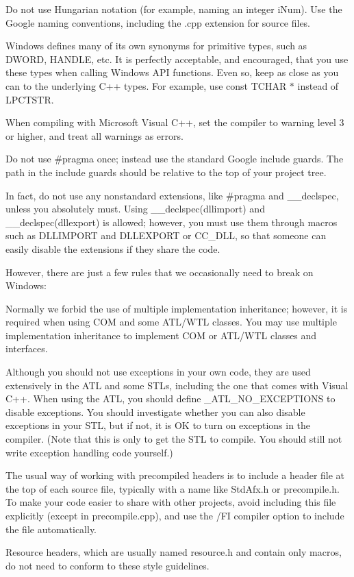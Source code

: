 \begin{DoxyItemize}
\item Do not use Hungarian notation (for example, naming an integer i\+Num). Use the Google naming conventions, including the .cpp extension for source files.
\item Windows defines many of its own synonyms for primitive types, such as D\+W\+O\+RD, H\+A\+N\+D\+LE, etc. It is perfectly acceptable, and encouraged, that you use these types when calling Windows A\+PI functions. Even so, keep as close as you can to the underlying C++ types. For example, use const T\+C\+H\+AR $\ast$ instead of L\+P\+C\+T\+S\+TR.
\item When compiling with Microsoft Visual C++, set the compiler to warning level 3 or higher, and treat all warnings as errors.
\item Do not use \#pragma once; instead use the standard Google include guards. The path in the include guards should be relative to the top of your project tree.
\item In fact, do not use any nonstandard extensions, like \#pragma and \+\_\+\+\_\+declspec, unless you absolutely must. Using {\ttfamily \+\_\+\+\_\+declspec(dllimport)} and {\ttfamily \+\_\+\+\_\+declspec(dllexport)} is allowed; however, you must use them through macros such as {\ttfamily D\+L\+L\+I\+M\+P\+O\+RT} and {\ttfamily D\+L\+L\+E\+X\+P\+O\+RT} or {\ttfamily C\+C\+\_\+\+D\+LL}, so that someone can easily disable the extensions if they share the code.
\end{DoxyItemize}

However, there are just a few rules that we occasionally need to break on Windows\+:


\begin{DoxyItemize}
\item Normally we forbid the use of multiple implementation inheritance; however, it is required when using C\+OM and some A\+T\+L/\+W\+TL classes. You may use multiple implementation inheritance to implement C\+OM or A\+T\+L/\+W\+TL classes and interfaces.
\item Although you should not use exceptions in your own code, they are used extensively in the A\+TL and some S\+T\+Ls, including the one that comes with Visual C++. When using the A\+TL, you should define \+\_\+\+A\+T\+L\+\_\+\+N\+O\+\_\+\+E\+X\+C\+E\+P\+T\+I\+O\+NS to disable exceptions. You should investigate whether you can also disable exceptions in your S\+TL, but if not, it is OK to turn on exceptions in the compiler. (Note that this is only to get the S\+TL to compile. You should still not write exception handling code yourself.)
\item The usual way of working with precompiled headers is to include a header file at the top of each source file, typically with a name like Std\+Afx.\+h or precompile.\+h. To make your code easier to share with other projects, avoid including this file explicitly (except in precompile.\+cpp), and use the /\+FI compiler option to include the file automatically.
\item Resource headers, which are usually named resource.\+h and contain only macros, do not need to conform to these style guidelines.
\end{DoxyItemize}


